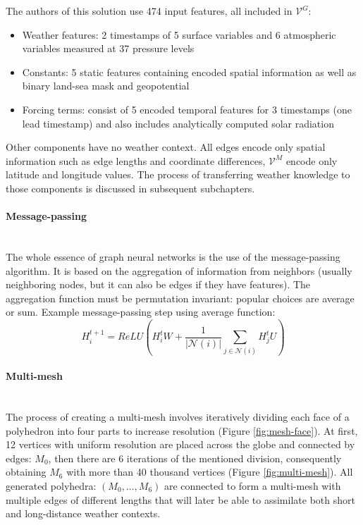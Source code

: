 The authors of this solution use 474 input features, all included in $\mathcal{V}^{G}$:
\begin{itemize}
    \item Weather features: 2 timestamps of 5 surface variables and 6 atmospheric variables measured at 37 pressure levels
    \item Constants: 5 static features containing encoded spatial information as well as binary land-sea mask and geopotential
    \item Forcing terms: consist of 5 encoded temporal features for 3 timestamps (one lead timestamp) and also includes analytically computed solar radiation
\end{itemize}

Other components have no weather context. All edges encode only spatial information such as edge lengths and coordinate differences, $\mathcal{V}^M$ encode only latitude and longitude values. The process of transferring weather knowledge to those components is discussed in subsequent subchapters.

\paragraph{Message-passing} \mbox{} \\
\noindent The whole essence of graph neural networks is the use of the message-passing algorithm. It is based on the aggregation of information from neighbors (usually neighboring nodes, but it can also be edges if they have features). The aggregation function must be permutation invariant: popular choices are average or sum. Example message-passing step using average function:
\[
    H_i^{t+1} = ReLU\left(H_i^t W  + \frac{1}{|\mathcal{N}(i)|} \sum_{j \in \mathcal{N}(i)} H_j^t U\right)
\]

\paragraph{Multi-mesh} \mbox{} \\
\noindent The process of creating a multi-mesh involves iteratively dividing each face of a polyhedron into four parts to increase resolution (Figure \ref{fig:mesh-face}). At first, 12 vertices with uniform resolution are placed across the globe and connected by edges: $M_0$, then there are 6 iterations of the mentioned division, consequently obtaining $M_6$ with more than 40 thousand vertices (Figure \ref{fig:multi-mesh}). All generated polyhedra: $(M_0,..., M_6)$ are connected to form a multi-mesh with multiple edges of different lengths that will later be able to assimilate both short and long-distance weather contexts. \\

